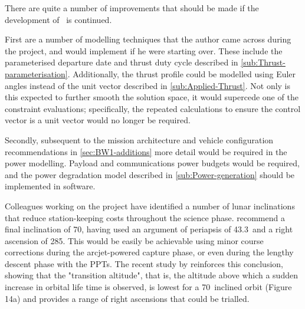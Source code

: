 There are quite a number of improvements that should be made if the development of \BW\ is continued. 

First are a number of modelling techniques that the author came across during the project, and would implement if he were starting over. These include the parameterised departure date and thrust duty cycle described in \autoref{sub:Thrust-parameterisation}. Additionally, the thrust profile could be modelled using Euler angles instead of the unit vector described in \autoref{sub:Applied-Thrust}. Not only is this expected to further smooth the solution space, it would supercede one of the constraint evaluations; specifically, the repeated calculations to ensure the control vector is  a unit vector would no longer be required.

Secondly, subsequent to the mission architecture and vehicle configuration recommendations in \autoref{sec:BW1-additions} more detail would be required in the power modelling. Payload and communications power budgets would be required, and the power degradation model described in \autoref{sub:Power-generation} should be implemented in software.


Colleagues working on the project have identified a number of lunar inclinations that reduce station-keeping costs throughout the science phase. \textcite{Zeile2010} recommend a final inclination of 70\degrees, having used an argument of periapsis of 43.3\degrees\ and a right ascension of 285\degrees. This would be easily be achievable using minor course corrections during the arcjet-powered capture phase, or even during the lengthy descent phase with the PPTs. The recent study by \textcite{Gupta2011} reinforces this conclusion, showing that the "transition altitude", that is, the altitude above which a sudden increase in orbital life time is observed, is lowest for a 70\degrees\ inclined orbit (Figure 14a) and provides a range of right ascensions that could be trialled.

